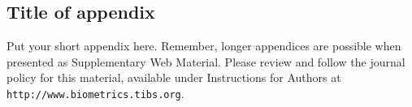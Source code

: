 \documentclass[useAMS,usenatbib]{biom}
\begin{document}
\appendix


\section{}
\subsection{Title of appendix}

Put your short appendix here.  Remember, longer appendices are
possible when presented as Supplementary Web Material.  Please 
review and follow the journal policy for this material, available
under Instructions for Authors at \texttt{http://www.biometrics.tibs.org}.

\label{lastpage}
\end{document}
